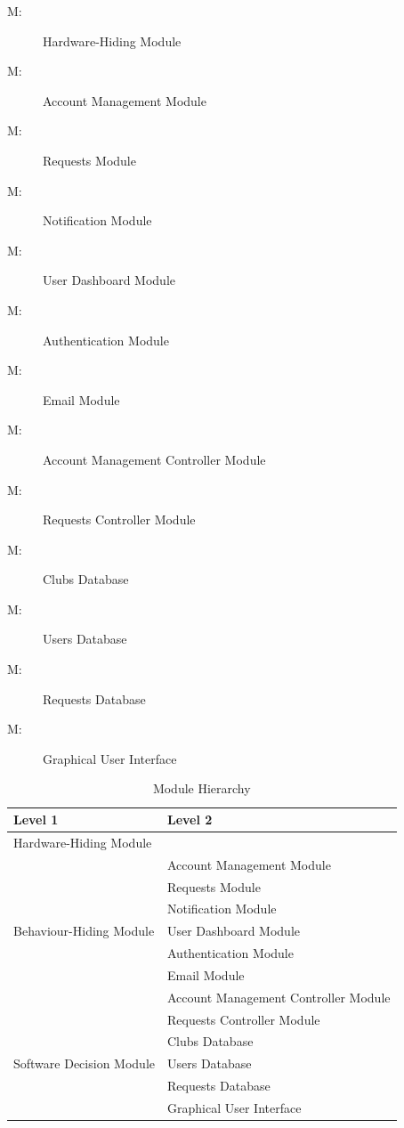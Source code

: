 \documentclass[12pt, titlepage]{article}
\newcounter{mnum}
\newcommand{\mthemnum}{M\themnum}
\begin{document}
\begin{description}
\item [ \mthemnum \label{mHH}:] Hardware-Hiding Module
\item [ \mthemnum \label{mBH1}:] Account Management Module
\item [ \mthemnum \label{mBH2}:] Requests Module
\item [ \mthemnum \label{mBH3}:] Notification Module
\item [ \mthemnum \label{mBH4}:] User Dashboard Module
\item [ \mthemnum \label{mBH5}:] Authentication Module
\item [ \mthemnum \label{mBH6}:] Email Module
\item [ \mthemnum \label{mBH7}:] Account Management Controller Module
\item [ \mthemnum \label{mBH8}:] Requests Controller Module
\item [ \mthemnum \label{mSD1}:] Clubs Database
\item [ \mthemnum \label{mSD2}:] Users Database
\item [ \mthemnum \label{mSD3}:] Requests Database
\item [ \mthemnum \label{mSD4}:] Graphical User Interface
\end{description}


\begin{table}[h!]
\centering
\begin{tabular}{p{} p{}}
\toprule
\textbf{Level 1} & \textbf{Level 2}\\
\midrule

{Hardware-Hiding Module} & ~ \\
\midrule

\multirow{7}{0.3\textwidth}{Behaviour-Hiding Module} 
& Account Management Module\\
& Requests Module\\
& Notification Module\\
& User Dashboard Module\\
& Authentication Module\\
& Email Module\\
& Account Management Controller Module\\
& Requests Controller Module\\
\midrule

\multirow{3}{0.3\textwidth}{Software Decision Module} 
& Clubs Database\\
& Users Database\\
& Requests Database\\
& Graphical User Interface\\
\bottomrule

\end{tabular}
\caption{Module Hierarchy}
\label{TblMH}
\end{table}
\end{document}
